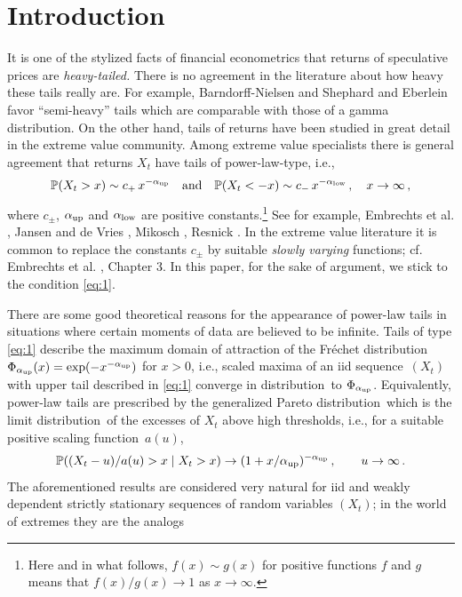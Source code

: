 \documentclass[11pt,a4]{amsart}
\newcommand{\beao}{\begin{eqnarray*}}
\newcommand{\eeao}{\end{eqnarray*}\noindent}
\newcommand{\beam}{\begin{eqnarray}}
\newcommand{\eeam}{\end{eqnarray}\noindent}
\newcommand{\xto}{x\to\infty}
\newcommand{\fct}{function}
\newcommand{\ds}{distribution}
\newcommand{\seq}{sequence}
\renewcommand{\P }{{\mathbb P}}
\newcommand{\1}{{\mathbf 1}}
\begin{document}
\section{Introduction}\setcounter{equation}{0}
It is one of the stylized facts of financial econometrics that 
returns of speculative prices are {\em heavy-tailed.} There is no agreement
in the literature about how heavy these tails really are. For example, Barndorff-Nielsen and Shephard
\cite{barndorff:shephard:2001} and Eberlein \cite{eberlein:2001} favor ``semi-heavy'' tails
which are comparable with those of a gamma \ds . On the other
hand, tails of returns have been studied in great detail 
in the extreme value community. Among extreme value specialists
there is general agreement that returns $X_t$ have tails of power-law-type, i.e.,
\beam\label{eq:1}
\P(X_t>x)\sim c_+ \,x^{-\alpha_{\rm up}}\quad\mbox{and}\quad \P(X_t<-x)\sim c_-\,x^{-\alpha_{\rm low}}\,,\quad\xto\,,
\eeam  
where $c_{\pm}$, $\alpha_{\rm up}$ and $\alpha_{\rm low}$ are positive constants.\footnote{Here and in what
  follows, $f(x)\sim g(x)$ for positive \fct s $f$ and $g$ means 
that $f(x)/g(x)\to 1$ as $\xto$.} See for example, Embrechts et
al. \cite{embrechts:klueppelberg:mikosch:1997}, Jansen and de Vries
\cite{jansen1991frequency}, Mikosch \cite{mikosch:2003}, Resnick
\cite{resnick:2007}.  
In the extreme value literature it is common to replace the constants $c_\pm$ by suitable
{\em slowly varying} \fct s; cf. Embrechts et
al. \cite{embrechts:klueppelberg:mikosch:1997}, Chapter 3. In this
paper, for the  
sake of argument, we stick to the condition \eqref{eq:1}.
\par
There are some good theoretical reasons for the appearance of power-law tails in situations where certain moments 
of data are believed to be infinite. Tails of type \eqref{eq:1}
describe the maximum domain of attraction of the  
Fr\'echet \ds\ $\Phi_{\alpha_{\rm up}}(x)=\exp(-x^{-\alpha_{\rm up}})$ for $x>0$, i.e., scaled maxima of an iid \seq\ $(X_t)$ with
upper tail described in \eqref{eq:1} converge in \ds\ to $\Phi_{\alpha_{\rm up}}$.
Equivalently, power-law tails are prescribed by the 
generalized Pareto \ds\ which is the limit \ds\ of the excesses of $X_t$ above high thresholds, i.e., for a suitable positive scaling \fct\ $a(u)$,
\beao
\P((X_t-u)/a(u)>x \mid X_t>x) \to (1+ x/\alpha_{\rm up})^{-\alpha_{\rm up}}\,,\qquad u\to\infty\,.
\eeao
The aforementioned results 
are considered very natural for iid and weakly dependent strictly stationary \seq s of random variables $(X_t)$; 
in the world of extremes they are the analogs
\end{document}
